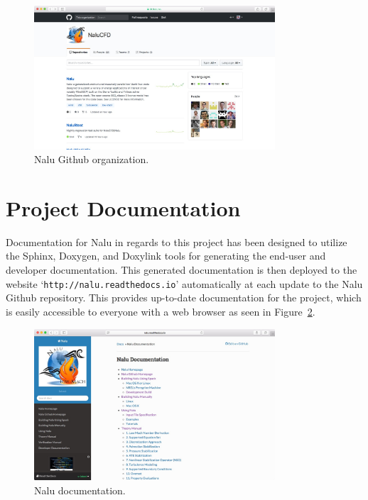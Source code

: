 \documentclass[12pt, oneside]{article}
\begin{document}
\begin{figure}
  \centering
    \includegraphics[width=0.8\textwidth]{nalucfd-github}
  \caption{Nalu Github organization.}
  \label{fig:nalucfd-github}
\end{figure}

\section{Project Documentation}

Documentation for Nalu in regards to this project has been designed to utilize the Sphinx, Doxygen, and Doxylink tools for generating the end-user and developer documentation. This generated documentation is then deployed to the website `\texttt{http://nalu.readthedocs.io}' automatically at each update to the Nalu Github repository. This provides up-to-date documentation for the project, which is easily accessible to everyone with a web browser as seen in Figure~\ref{fig:nalu-rtd}.

\begin{figure}
  \centering
    \includegraphics[width=0.8\textwidth]{nalu-rtd}
  \caption{Nalu documentation.}
  \label{fig:nalu-rtd}
\end{figure}
\end{document}
